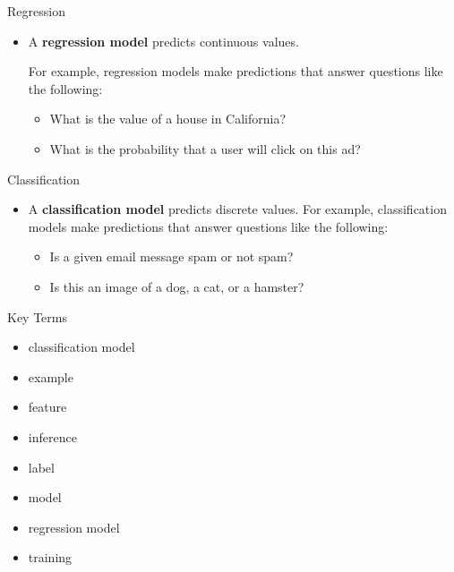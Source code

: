 \documentclass{beamer}
\begin{document}
\begin{frame}{Regression}
\begin{itemize}
\item A {\bf regression model} predicts continuous values. 

\medskip
For example, regression models make predictions that answer questions like the following:
    
\medskip    
\begin{itemize}

\medskip
\item What is the value of a house in California?

\medskip
\item What is the probability that a user will click on this ad?
\end{itemize}
\end{itemize}
\end{frame}


\begin{frame}{Classification}
\begin{itemize}
\item A {\bf classification model} predicts discrete values. For example, classification models make predictions that answer questions like the following:

\medskip
\begin{itemize}
\item Is a given email message spam or not spam?

\medskip
\item Is this an image of a dog, a cat, or a hamster?
\end{itemize}
\end{itemize}
\end{frame}


\begin{frame}{Key Terms}
\begin{itemize}
    \item classification model
    \item example
    \item feature
    \item inference
    \item label
    \item model
    \item regression model
    \item training
\end{itemize}
\end{frame}

\end{document}
